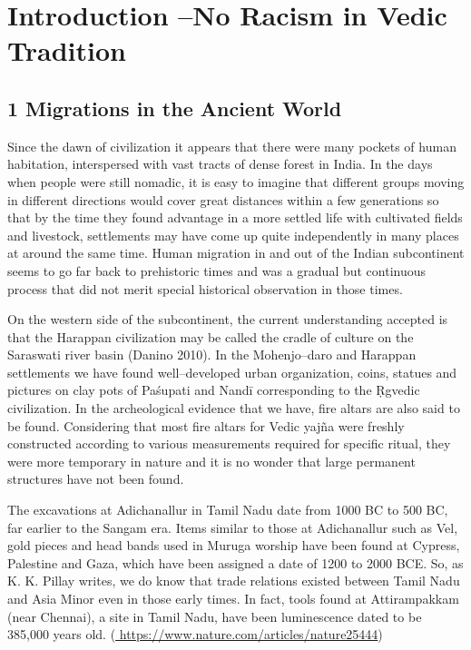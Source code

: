 
\chapter{Introduction –\break No Racism in Vedic Tradition}\label{intro}



\section*{1 Migrations in the Ancient World}

Since the dawn of civilization it appears that there were many pockets of human habitation, interspersed with vast tracts of dense forest in India. In the days when people were still nomadic, it is easy to imagine that different groups moving in different directions would cover great distances within a few generations so that by the time they found advantage in a more settled life with cultivated fields and livestock, settlements may have come up quite independently in many places at around the same time. Human migration in and out of the Indian subcontinent seems to go far back to prehistoric times and was a gradual but continuous process that did not merit special historical observation in those times.

On the western side of the subcontinent, the current understanding accepted is that the Harappan civilization may be called the cradle of culture on the Saraswati river basin (Danino 2010). In the Mohenjo–daro and Harappan settlements we have found well–developed urban organization, coins, statues and pictures on clay pots of Paśupati and Nandī corresponding to the Ṛgvedic civilization. In the archeological evidence that we have, fire altars are also said to be found. Considering that most fire altars for Vedic yajña were freshly constructed according to various measurements required for specific ritual, they were more temporary in nature and it is no wonder that large permanent structures have not been found.

\newpage

The excavations at Adichanallur in Tamil Nadu date from 1000 BC to 500 BC, far earlier to the Sangam era. Items similar to those at Adichanallur such as Vel, gold pieces and head bands used in Muruga worship have been found at Cypress, Palestine and Gaza, which have been assigned a date of 1200 to 2000 BCE. So, as K. K. Pillay writes, we do know that trade relations existed between Tamil Nadu and Asia Minor even in those early times. In fact, tools found at Attirampakkam (near Chennai), a site in Tamil Nadu, have been luminescence dated to be 385,000 years old. (\url{ https://www.nature.com/articles/nature25444})

